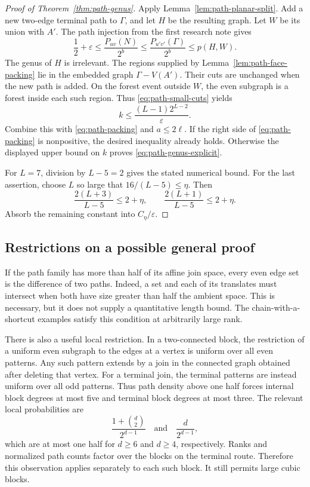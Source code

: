 \begin{proof}[Proof of Theorem~\ref{thm:path-genus}]
Apply Lemma~\ref{lem:path-planar-split}.
Add a new two-edge terminal path to $\Gamma$, and let $H$ be the resulting graph.
Let $W$ be its union with $A'$.
The path injection from the first research note gives
\[
 \frac12+\varepsilon
 \le\frac{P_{uv}(N)}{2^b}
 \le\frac{P_{u'v'}(\Gamma)}{2^b}
 \le p(H,W).
\]
The genus of $H$ is irrelevant.
The regions supplied by Lemma~\ref{lem:path-face-packing} lie in the embedded graph $\Gamma-V(A')$.
Their cuts are unchanged when the new path is added.
On the forest event outside $W$, the even subgraph is a forest inside each such region.
Thus \eqref{eq:path-small-cuts} yields
\[
 k\le\frac{(L-1)2^{L-2}}{\varepsilon}.
\]
Combine this with \eqref{eq:path-packing} and $a\le2\ell$.
If the right side of \eqref{eq:path-packing} is nonpositive, the desired inequality already holds.
Otherwise the displayed upper bound on $k$ proves \eqref{eq:path-genus-explicit}.

For $L=7$, division by $L-5=2$ gives the stated numerical bound.
For the last assertion, choose $L$ so large that $16/(L-5)\le\eta$.
Then
\[
 \frac{2(L+3)}{L-5}\le2+\eta,
 \qquad
 \frac{2(L+1)}{L-5}\le2+\eta.
\]
Absorb the remaining constant into $C_\eta/\varepsilon$.
\end{proof}

\subsection{Restrictions on a possible general proof}

If the path family has more than half of its affine join space, every even edge set is the difference of two paths.
Indeed, a set and each of its translates must intersect when both have size greater than half the ambient space.
This is necessary, but it does not supply a quantitative length bound.
The chain-with-a-shortcut examples satisfy this condition at arbitrarily large rank.

There is also a useful local restriction.
In a two-connected block, the restriction of a uniform even subgraph to the edges at a vertex is uniform over all even patterns.
Any such pattern extends by a join in the connected graph obtained after deleting that vertex.
For a terminal join, the terminal patterns are instead uniform over all odd patterns.
Thus path density above one half forces internal block degrees at most five and terminal block degrees at most three.
The relevant local probabilities are
\[
 \frac{1+\binom d2}{2^{d-1}}\quad\text{and}\quad
 \frac{d}{2^{d-1}},
\]
which are at most one half for $d\ge6$ and $d\ge4$, respectively.
Ranks and normalized path counts factor over the blocks on the terminal route.
Therefore this observation applies separately to each such block.
It still permits large cubic blocks.

